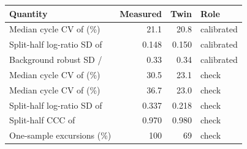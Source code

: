 \begin{tabular}{lrrl}
\toprule
Quantity & Measured & Twin & Role \\
\midrule
Median cycle CV of \RMS{} (\%) & 21.1 & 20.8 & calibrated \\
Split-half log-ratio SD of \RMS{} & 0.148 & 0.150 & calibrated \\
Background robust SD / \RMS{} & 0.33 & 0.34 & calibrated \\
Median cycle CV of \Vpp{} (\%) & 30.5 & 23.1 & check \\
Median cycle CV of \Vmax{} (\%) & 36.7 & 23.0 & check \\
Split-half log-ratio SD of \Vmax{} & 0.337 & 0.218 & check \\
Split-half CCC of \RMS{} & 0.970 & 0.980 & check \\
One-sample excursions (\%) & 100 & 69 & check \\
\bottomrule
\end{tabular}

